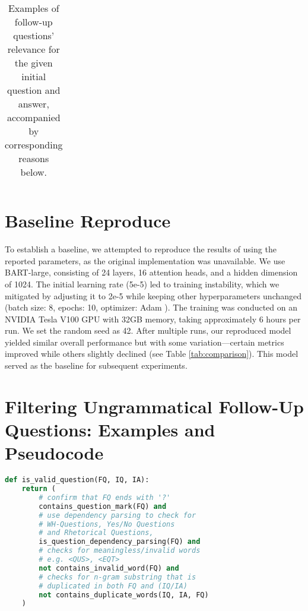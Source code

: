 \begin{table}[H]
{\begin{tabular}{ p{0.5\linewidth} | p{0.5\linewidth} }
            \bottomrule
        \end{tabular}
    }
    \caption{Examples of follow-up questions' relevance for the given initial question and answer, accompanied by corresponding reasons below.}
    \label{tab:relate_followupq}
\end{table}

\section{Baseline Reproduce}
\label{appendix:baseline_reproduce}

To establish a baseline, we attempted to reproduce the results of \citet{meng-etal-2023-followupqg} using the reported parameters, as the original implementation was unavailable. We use BART-large, consisting of 24 layers, 16 attention heads, and a hidden dimension of 1024. The initial learning rate (5e-5) led to training instability, which we mitigated by adjusting it to 2e-5 while keeping other hyperparameters unchanged (batch size: 8, epochs: 10, optimizer: Adam \cite{kinga2015method}). The training was conducted on an NVIDIA Tesla V100 GPU with 32GB memory, taking approximately 6 hours per run. We set the random seed as 42. After multiple runs, our reproduced model yielded similar overall performance but with some variation—certain metrics improved while others slightly declined (see Table \ref{tab:comparison}). This model served as the baseline for subsequent experiments.


\section{Filtering Ungrammatical Follow-Up Questions: Examples and Pseudocode}
\label{appendix:ungrammatical_questions}

\begin{lstlisting}[language=Python, breaklines, basicstyle=\small\ttfamily]
def is_valid_question(FQ, IQ, IA):
    return (
        # confirm that FQ ends with '?'
        contains_question_mark(FQ) and 
        # use dependency parsing to check for
        # WH-Questions, Yes/No Questions
        # and Rhetorical Questions, 
        is_question_dependency_parsing(FQ) and 
        # checks for meaningless/invalid words
        # e.g. <QUS>, <EQT>
        not contains_invalid_word(FQ) and
        # checks for n-gram substring that is 
        # duplicated in both FQ and (IQ/IA)
        not contains_duplicate_words(IQ, IA, FQ)
    )
\end{lstlisting}

